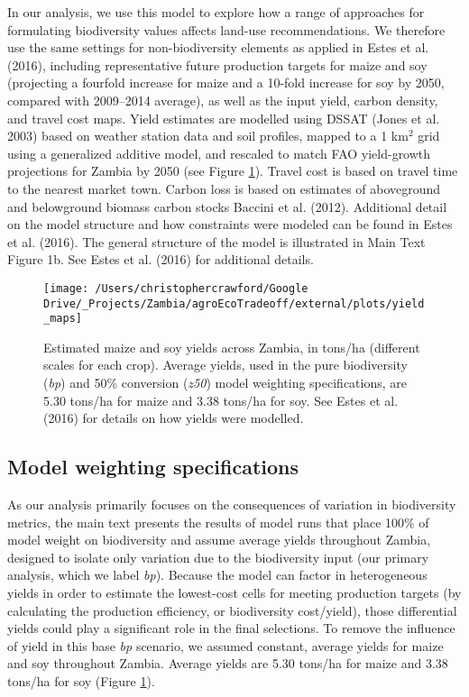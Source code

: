 \documentclass[
]{article}
\begin{document}
In our analysis, we use this model to explore how a range of approaches for formulating biodiversity values affects land-use recommendations. We therefore use the same settings for non-biodiversity elements as applied in Estes et al. (2016), including representative future production targets for maize and soy (projecting a fourfold increase for maize and a 10-fold increase for soy by 2050, compared with 2009--2014 average), as well as the input yield, carbon density, and travel cost maps. Yield estimates are modelled using DSSAT (Jones et al. 2003) based on weather station data and soil profiles, mapped to a 1 km\(^2\) grid using a generalized additive model, and rescaled to match FAO yield-growth projections for Zambia by 2050 (see Figure \ref{fig:yield}). Travel cost is based on travel time to the nearest market town. Carbon loss is based on estimates of aboveground and belowground biomass carbon stocks Baccini et al. (2012). Additional detail on the model structure and how constraints were modeled can be found in Estes et al. (2016). The general structure of the model is illustrated in Main Text Figure 1b. See Estes et al. (2016) for additional details.



\begin{figure}
\texttt{[image: /Users/christophercrawford/Google Drive/\_Projects/Zambia/agroEcoTradeoff/external/plots/yield\_maps]} \caption{Estimated maize and soy yields across Zambia, in tons/ha (different scales for each crop). Average yields, used in the pure biodiversity (\emph{bp}) and 50\% conversion (\emph{z50}) model weighting specifications, are 5.30 tons/ha for maize and 3.38 tons/ha for soy. See Estes et al. (2016) for details on how yields were modelled.}\label{fig:yield}
\end{figure}

\hypertarget{model-weights}{%
\subsection{Model weighting specifications}\label{model-weights}}

As our analysis primarily focuses on the consequences of variation in biodiversity metrics, the main text presents the results of model runs that place 100\% of model weight on biodiversity and assume average yields throughout Zambia, designed to isolate only variation due to the biodiversity input (our primary analysis, which we label \emph{bp}). Because the model can factor in heterogeneous yields in order to estimate the lowest-cost cells for meeting production targets (by calculating the production efficiency, or biodiversity cost/yield), those differential yields could play a significant role in the final selections. To remove the influence of yield in this base \emph{bp} scenario, we assumed constant, average yields for maize and soy throughout Zambia. Average yields are 5.30 tons/ha for maize and 3.38 tons/ha for soy (Figure \ref{fig:yield}).
\end{document}

